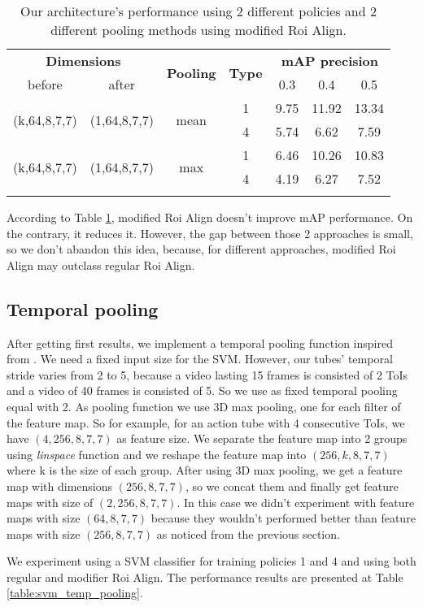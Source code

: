 \begin{center}
\begin{longtable}{||c | c | c| c||c c c||}

  \hline
  \multicolumn{2}{||c|}{\textbf{Dimensions}} & \multirow{2}{*}{ \textbf{Pooling}} &\multirow{2}{*}{\textbf{Type}} & \multicolumn{3}{|c||}{\textbf{mAP precision}}\\

   before & after &  {} & {} &  0.3 &  0.4 & 0.5 \\
 \hline   \hline
 \multirow{2}{*}{(k,64,8,7,7)} & \multirow{2}{*}{(1,64,8,7,7)} & \multirow{2}{*}{mean}  & 1 & 9.75 & 11.92 & 13.34 \\
  \cline{4-7}
  {} & {} & {} & 4 &  5.74 &6.62 & 7.59 \\
  \hline
 \multirow{2}{*}{(k,64,8,7,7)} & \multirow{2}{*}{(1,64,8,7,7)} & \multirow{2}{*}{max}  & 1 &  6.46 & 10.26 & 10.83 \\
    \cline{4-7}
  {} & {} & {} & 4 & 4.19 & 6.27 & 7.52 \\
    \cline{4-7}
  \hline
  \caption{Our architecture's performance using 2 different policies and 2 different pooling methods using modified Roi Align.}
  \label{table:svm_mod_roialign}

\end{longtable} 
\end{center}

According to Table \ref{table:svm_mod_roialign}, modified Roi Align doesn't improve mAP performance. On the contrary, it reduces it.
However, the gap between those 2 approaches is small, so we don't abandon this idea, because, for different approaches,
modified Roi Align may outclass regular Roi Align.

\subsection{Temporal pooling}
After getting first results, we implement a temporal pooling function inspired from \cite{DBLP:journals/corr/HouCS17}. We need a
fixed input size for the SVM. However, our tubes' temporal stride varies from 2 to 5, because a video lasting 15 frames
is consisted of 2 ToIs and a video of 40 frames is consisted of 5. So we use as fixed temporal pooling equal
with 2. As pooling function we use 3D max pooling, one for each filter of the feature map.  So for example, for an action tube
with 4 consecutive ToIs, we  have $(4,256,8,7,7)$ as feature size. We separate the feature map into 2 groups using \textit{linspace}
function and we reshape the feature map into $(256,k,8,7,7)$ where k is the size of each group. After using 3D max pooling, we get
a feature map with dimensions $(256,8,7,7)$, so we concat them and finally get feature maps with size of $(2,256,8,7,7)$.
In this case we didn't experiment with feature maps with size $(64,8,7,7)$ because they wouldn't performed better than  feature maps with size $(256,8,7,7)$ as noticed from the previous section. \par
We experiment using a SVM classifier for training policies 1 and 4 and using both regular and modifier Roi Align. The
performance results are presented at Table \ref{table:svm_temp_pooling}.

